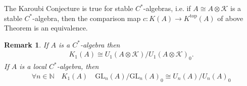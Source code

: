 \documentclass{beamer}
\theoremstyle{plain}
\newtheorem{rem}{Remark}
\newcommand{\bean}{\begin{eqnarray*}}
\newcommand{\eean}{\end{eqnarray*}}
\newcommand{\K}{\mathcal{K}}
\newcommand{\N}{\mathbb{N}}                  %
\begin{document}
\begin{frame}
	
	\begin{theorem}
		The Karoubi Conjecture is true for stable $C^*$-algebras, i.e. if $A \cong A \otimes \K$  is a stable $C^*$-algebra, then the comparison map $c : K(A)\to K^{\mathrm{top}}(A)$ of
	above	Theorem  is an equivalence.
	\end{theorem}
\begin{rem}
	If $A$ is a $C^*$-algebra then
	\bean
	K_1\left(A \right) \cong U_1\left(  A \otimes \K \right) / U_1\left( A \otimes \K \right)_0.
	\eean
	If $A$ is a local $C^*$-algebra, then 
	\bean
	\forall n \in \N \quad K_1\left(A \right) \quad \mathrm{GL}_n\left( A \right) / \mathrm{GL}_n\left( A \right)_0\cong U_n\left( A \right) / U_n\left( A \right)_0
	\eean
	
\end{rem}	
\end{frame}
\end{document}
